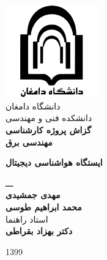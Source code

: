 \begin{titlepage}
	\begin{center}
		\includegraphics[width=0.3\textwidth]{Assets/logo.pdf}\\
		\smallskip \LARGE
		{دانشگاه دامغان}\\
		{دانشکده فنی و ‌مهندسی}\\
	
		\vspace{1cm} \LARGE
		\textbf{گزاش پروژه کارشناسی\\مهندسی برق}\\
		
		\vspace{2cm}
		
		\huge
		\textbf{ایستگاه هواشناسی دیجیتال}
		
		\LARGE
		\vspace{2cm}
		{ـــ}\\
		\vspace{0.25cm}
		\textbf{مهدی ‌جمشیدی\\محمد ابراهیم طوسی}\\
	
		\vspace{1.2cm}
		{استاد راهنما}\\
		\vspace{0.25cm}
		\textbf{دکتر بهزاد بقراطی}
		
		\vfill
		{1399}
	\end{center}
\end{titlepage}